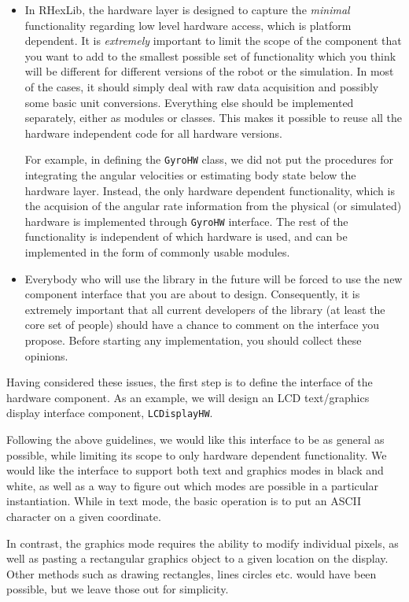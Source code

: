 \begin{itemize}
\item{In RHexLib, the hardware layer is designed to capture the {\em
minimal} functionality regarding low level hardware access, which is
platform dependent. It is {\em extremely} important to limit the scope of
the component that you want to add to the smallest possible set of
functionality which you think will be different for different versions of
the robot or the simulation. In most of the cases, it should simply deal
with raw data acquisition and possibly some basic unit
conversions. Everything else should be implemented separately, either as
modules or classes. This makes it possible to reuse all the hardware
independent code for all hardware versions.

For example, in defining the {\tt GyroHW} class, we did not put the
procedures for integrating the angular velocities or estimating body state
below the hardware layer. Instead, the only hardware dependent
functionality, which is the acquision of the angular rate information from
the physical (or simulated) hardware is implemented through {\tt GyroHW}
interface. The rest of the functionality is independent of which hardware is
used, and can be implemented in the form of commonly usable modules.}
\item{Everybody who will use the library in the future will be forced to use
the new component interface that you are about to design. Consequently, it
is extremely important that all current developers of the library (at least
the core set of people) should have a chance to comment on the interface you
propose. Before starting any implementation, you should collect these
opinions.}
\end{itemize}

Having considered these issues, the first step is to define the interface of
the hardware component. As an example, we will design an LCD text/graphics
display interface component, {\tt LCDisplayHW}.

Following the above guidelines, we would like this interface to be as
general as possible, while limiting its scope to only hardware dependent
functionality. We would like the interface to support both text and graphics
modes in black and white, as well as a way to figure out which modes are
possible in a particular instantiation. While in text mode, the basic
operation is to put an ASCII character on a given coordinate. 

In contrast, the graphics mode requires the ability to modify individual
pixels, as well as pasting a rectangular graphics object to a given location
on the display. Other methods such as drawing rectangles, lines circles
etc. would have been possible, but we leave those out for simplicity.

